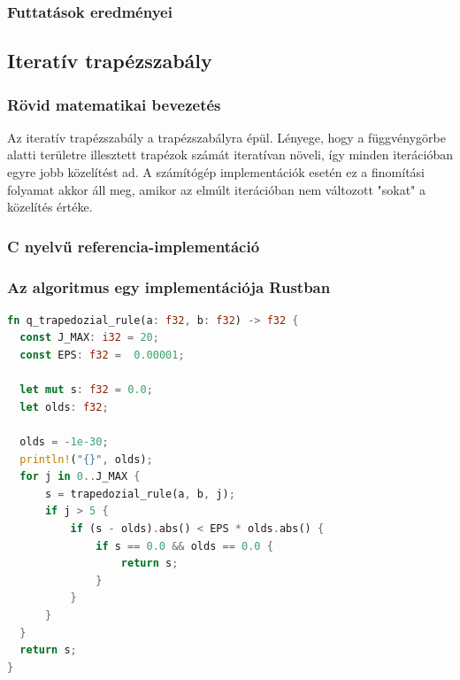\subsubsection{Futtatások eredményei}

\subsection{Iteratív trapézszabály}

\subsubsection{Rövid matematikai bevezetés}

Az iteratív trapézszabály a trapézszabályra épül. Lényege, hogy a függvénygörbe alatti területre illesztett trapézok számát iteratívan növeli, így minden iterációban egyre jobb közelítést ad. A számítógép implementációk esetén ez a finomítási folyamat akkor áll meg, amikor az elmúlt iterációban nem változott "sokat" a közelítés értéke.

\subsubsection{C nyelvű referencia-implementáció}

\subsubsection{Az algoritmus egy implementációja Rustban}
\begin{lstlisting}[language=Rust]
fn q_trapedozial_rule(a: f32, b: f32) -> f32 {
  const J_MAX: i32 = 20;
  const EPS: f32 =  0.00001;
  
  let mut s: f32 = 0.0;
  let olds: f32;
  
  olds = -1e-30;
  println!("{}", olds);
  for j in 0..J_MAX {
	  s = trapedozial_rule(a, b, j);
	  if j > 5 {
		  if (s - olds).abs() < EPS * olds.abs() {
			  if s == 0.0 && olds == 0.0 {
				  return s;
			  }
		  }
	  }
  }
  return s;
}
\end{lstlisting}

